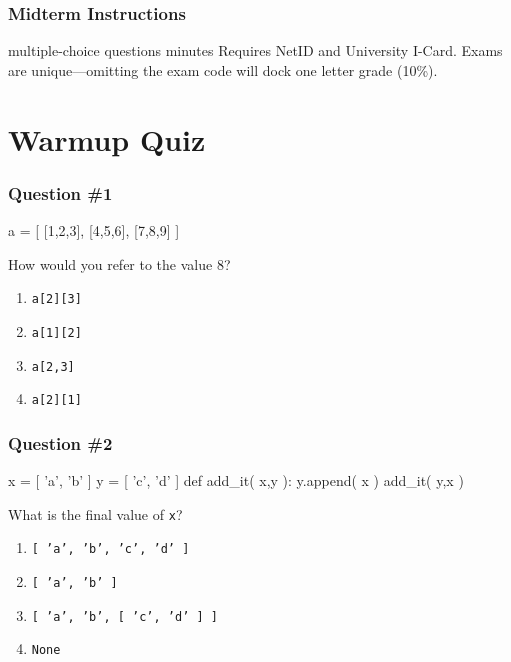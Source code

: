\documentclass[11pt]{beamer}
\begin{document}
\begin{frame}
  \frametitle{Midterm Instructions}
  \Enlarge

  \begin{itemize}
   multiple-choice questions
   minutes
  \myitem  Requires NetID and University I-Card.
  \mysubitem  Exams are unique—omitting the exam code will dock one letter grade (10\%).
  \end{itemize}
\end{frame}

\section{Warmup Quiz}

\begin{frame}[fragile]
  \frametitle{Question \#1}
  \Enlarge

  \begin{semiverbatim}
a = [ [1,2,3], [4,5,6], [7,8,9] ]
  \end{semiverbatim}
  How would you refer to the value 8?
  \begin{enumerate}[label=\Alph*]
  \item  \texttt{a[2][3]}
  \item  \texttt{a[1][2]}
  \item  \texttt{a[2,3]}
  \item  \texttt{a[2][1]}
  \end{enumerate}
\end{frame}

\begin{frame}[fragile]
  \frametitle{Question \#2}
  \Enlarge

  \begin{semiverbatim}
x = [ 'a', 'b' ]
y = [ 'c', 'd' ]
def add_it( x,y ):
    y.append( x )
add_it( y,x )
  \end{semiverbatim}
  What is the final value of \texttt{x}?
  \begin{enumerate}[label=\Alph*]
  \item  \texttt{[ 'a', 'b', 'c', 'd' ]}
  \item  \texttt{[ 'a', 'b' ]}
  \item  \texttt{[ 'a', 'b', [ 'c', 'd' ] ]}
  \item  \texttt{None}
  \end{enumerate}
\end{frame}
\end{document}

